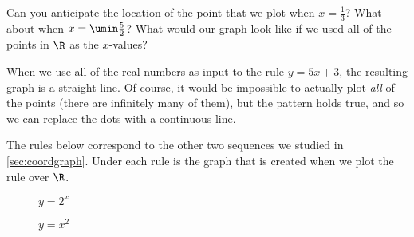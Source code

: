\begin{center}
\end{center}

Can you anticipate the location of the point that we plot when $x = \frac{1}{3}$? What about when $x = \umin\frac{5}{2}$? What would our graph look like if we used all of the points in $\R$ as the $x$-values?

When we use all of the real numbers as input to the rule $y = 5x + 3$, the resulting graph is a straight line. Of course, it would be impossible to actually plot \textit{all} of the points (there are infinitely many of them), but the pattern holds true, and so we can replace the dots with a continuous line.

\begin{center}
\end{center}

The rules below correspond to the other two sequences we studied in \cref{sec:coordgraph}. Under each rule is the graph that is created when we plot the rule over $\R$.

\begin{figure}
\begin{minipage}[c]{0.49\textwidth }
	\centering
	$y = 2^x$\par\medskip
\end{minipage}
%
\begin{minipage}[c]{0.49\textwidth }
	\centering
	$y = x^2$\par\medskip
\end{minipage}
\end{figure}

